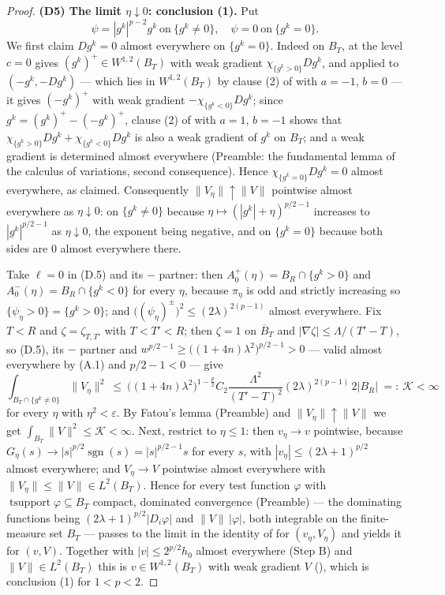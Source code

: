 \begin{proof}
\textbf{(D5) The limit $\eta\downarrow0$: conclusion (1).}  Put
\[
\psi=|g^k|^{p-2}g^k\ \text{on}\ \{g^k\ne0\},\quad\psi=0\ \text{on}\ \{g^k=0\} .
\]
We first claim $Dg^k=0$ almost everywhere on $\{g^k=0\}$.  Indeed on $B_T$,
 at the level $c=0$ gives $(g^k)^+\in
W^{1,2}(B_T)$ with weak gradient $\chi_{\{g^k>0\}}Dg^k$, and applied to
$(-g^k,-Dg^k)$ --- which lies in $W^{1,2}(B_T)$ by clause (2) of
 with $a=-1$, $b=0$ --- it gives $(-g^k)^+$ with
weak gradient $-\chi_{\{g^k<0\}}Dg^k$; since $g^k=(g^k)^+-(-g^k)^+$, clause (2)
of  with $a=1$, $b=-1$ shows that
$\chi_{\{g^k>0\}}Dg^k+\chi_{\{g^k<0\}}Dg^k$ is also a weak gradient of $g^k$ on
$B_T$; and a weak gradient is determined almost everywhere (Preamble: the
fundamental lemma of the calculus of variations, second consequence).  Hence
$\chi_{\{g^k=0\}}Dg^k=0$ almost everywhere, as claimed.  Consequently
$\|V_\eta\|\uparrow\|V\|$ pointwise almost everywhere as $\eta\downarrow0$: on
$\{g^k\ne0\}$ because $\eta\mapsto(|g^k|+\eta)^{p/2-1}$ increases to
$|g^k|^{p/2-1}$ as $\eta\downarrow0$, the exponent being negative, and on
$\{g^k=0\}$ because both sides are $0$ almost everywhere there.

Take $\ell=0$ in (D.5) and its $-$ partner: then $A^+_0(\eta)=B_R\cap\{g^k>0\}$
and $A^-_0(\eta)=B_R\cap\{g^k<0\}$ for every $\eta$, because $\pi_\eta$ is odd
and strictly increasing so $\{\psi_\eta>0\}=\{g^k>0\}$; and
$\bigl((\psi_\eta)^\pm\bigr)^2\le(2\lambda)^{2(p-1)}$ almost everywhere.  Fix
$T<R$ and $\zeta=\zeta_{T,T'}$ with $T<T'<R$; then $\zeta=1$ on $\overline B_T$
and $|\nabla\zeta|\le\Lambda/(T'-T)$, so (D.5), its $-$ partner and
$w^{p/2-1}\ge\bigl((1+4n)\lambda^2\bigr)^{p/2-1}>0$ --- valid almost everywhere
by (A.1) and $p/2-1<0$ --- give
\[
\int_{B_T\cap\{g^k\ne0\}}\|V_\eta\|^2
\ \le\ \bigl((1+4n)\lambda^2\bigr)^{1-\frac p2}C_2
\frac{\Lambda^2}{(T'-T)^2}(2\lambda)^{2(p-1)}\,2|B_R|\ =:\ \mathcal K<\infty
\]
for every $\eta$ with $\eta^2<\varepsilon$.  By Fatou's lemma (Preamble) and
$\|V_\eta\|\uparrow\|V\|$ we get $\int_{B_T}\|V\|^2\le\mathcal K<\infty$.
Next, restrict to $\eta\le1$: then $v_\eta\to v$ pointwise, because
$G_\eta(s)\to|s|^{p/2}\operatorname{sgn}(s)=|s|^{p/2-1}s$ for every $s$, with
$|v_\eta|\le(2\lambda+1)^{p/2}$ almost everywhere; and $V_\eta\to V$ pointwise
almost everywhere with $\|V_\eta\|\le\|V\|\in L^2(B_T)$.  Hence for every test
function $\varphi$ with $\operatorname{tsupport}\varphi\subseteq B_T$ compact,
dominated convergence (Preamble) --- the dominating functions being
$(2\lambda+1)^{p/2}|D_i\varphi|$ and $\|V\|\,|\varphi|$, both integrable on the
finite-measure set $B_T$ --- passes to the limit in the identity of
 for $(v_\eta,V_\eta)$ and yields it for $(v,V)$.
Together with $|v|\le2^{p/2}h_0$ almost everywhere (Step B) and
$\|V\|\in L^2(B_T)$ this is $v\in W^{1,2}(B_T)$ with weak gradient $V$
(), which is conclusion (1) for $1<p<2$.


\end{proof}
